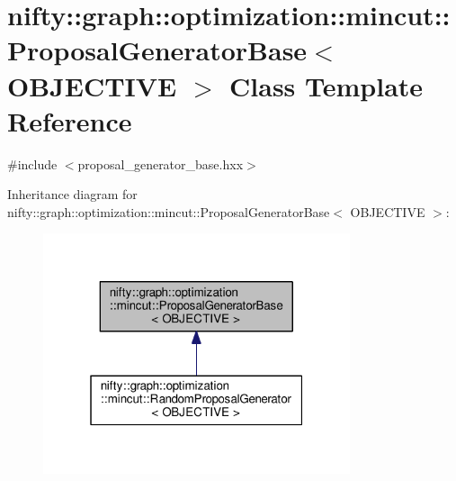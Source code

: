 \hypertarget{classnifty_1_1graph_1_1optimization_1_1mincut_1_1ProposalGeneratorBase}{}\section{nifty\+:\+:graph\+:\+:optimization\+:\+:mincut\+:\+:Proposal\+Generator\+Base$<$ O\+B\+J\+E\+C\+T\+I\+V\+E $>$ Class Template Reference}
\label{classnifty_1_1graph_1_1optimization_1_1mincut_1_1ProposalGeneratorBase}


{\ttfamily \#include $<$proposal\+\_\+generator\+\_\+base.\+hxx$>$}



Inheritance diagram for nifty\+:\+:graph\+:\+:optimization\+:\+:mincut\+:\+:Proposal\+Generator\+Base$<$ O\+B\+J\+E\+C\+T\+I\+V\+E $>$\+:\nopagebreak
\begin{figure}[H]
\begin{center}
\leavevmode
\includegraphics[width=256pt]{classnifty_1_1graph_1_1optimization_1_1mincut_1_1ProposalGeneratorBase__inherit__graph}
\end{center}
\end{figure}
